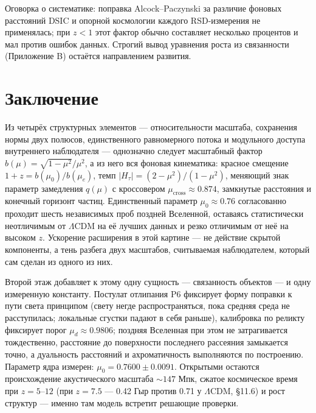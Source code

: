 \documentclass{article}
\begin{document}
Оговорка о систематике: поправка Alcock--Paczynski за различие фоновых расстояний DSIC и опорной космологии каждого RSD-измерения не применялась; при $z < 1$ этот фактор обычно составляет несколько процентов и мал против ошибок данных. Строгий вывод уравнения роста из связанности (Приложение B) остаётся направлением развития.

\section{Заключение}

Из четырёх структурных элементов --- относительности масштаба, сохранения нормы двух полюсов, единственного равномерного потока и модульного доступа внутреннего наблюдателя --- однозначно следует масштабный фактор $b(\mu) = \sqrt{1-\mu^2}/\mu^2$, а из него вся фоновая кинематика: красное смещение $1+z = b(\mu_0)/b(\mu_e)$, темп $|H_\tau| = (2-\mu^2)/(1-\mu^2)$, меняющий знак параметр замедления $q(\mu)$ с кроссовером $\mu_{\text{cross}} \approx 0.874$, замкнутые расстояния и конечный горизонт частиц. Единственный параметр $\mu_0 \approx 0.76$ согласованно проходит шесть независимых проб поздней Вселенной, оставаясь статистически неотличимым от $\Lambda$CDM на её лучших данных и резко отличимым от неё на высоком $z$. Ускорение расширения в этой картине --- не действие скрытой компоненты, а тень разбега двух масштабов, считываемая наблюдателем, который сам сделан из одного из них.

Второй этаж добавляет к этому одну сущность --- связанность объектов --- и одну измеренную константу. Постулат отлипания P6 фиксирует форму поправки к пути света принципом (свету негде распространяться, пока средняя среда не расступилась; локальные сгустки падают в себя раньше), калибровка по реликту фиксирует порог $\mu_d \approx 0.9806$; поздняя Вселенная при этом не затрагивается тождественно, расстояние до поверхности последнего рассеяния замыкается точно, а дуальность расстояний и ахроматичность выполняются по построению. Параметр ядра измерен: $\mu_0 = 0.7600 \pm 0.0091$. Открытыми остаются происхождение акустического масштаба ${\sim}147$ Мпк, сжатое космическое время при $z = 5\text{--}12$ (при $z = 7.5$ --- 0.42 Гыр против 0.71 у $\Lambda$CDM, \S11.6) и рост структур --- именно там модель встретит решающие проверки.
\end{document}
